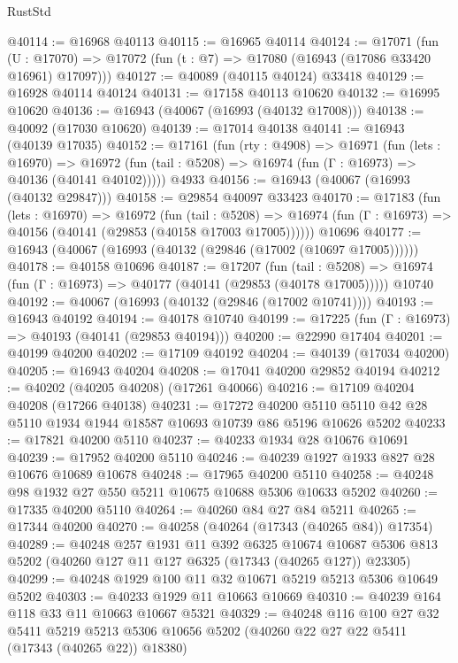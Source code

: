 \begin{lexlean}{RustStd}
\begin{coremodule}
@40114 := @16968 @40113
@40115 := @16965 @40114
@40124 := @17071
    (fun (U : @17070) => @17072 (fun (t : @7) => @17080 (@16943 (@17086 @33420 @16961) @17097)))
@40127 := @40089 (@40115 @40124) @33418
@40129 := @16928 @40114 @40124
@40131 := @17158 @40113 @10620
@40132 := @16995 @10620
@40136 := @16943 (@40067 (@16993 (@40132 @17008)))
@40138 := @40092 (@17030 @10620)
@40139 := @17014 @40138
@40141 := @16943 (@40139 @17035)
@40152 := @17161
    (fun (rty : @4908) =>
    @16971
      (fun (lets : @16970) =>
      @16972 (fun (tail : @5208) => @16974 (fun (Γ : @16973) => @40136 (@40141 @40102)))))
    @4933
@40156 := @16943 (@40067 (@16993 (@40132 @29847)))
@40158 := @29854 @40097 @33423
@40170 := @17183
    (fun (lets : @16970) =>
    @16972
      (fun (tail : @5208) =>
      @16974 (fun (Γ : @16973) => @40156 (@40141 (@29853 (@40158 @17003 @17005))))))
    @10696
@40177 := @16943 (@40067 (@16993 (@40132 (@29846 (@17002 (@10697 @17005))))))
@40178 := @40158 @10696
@40187 := @17207
    (fun (tail : @5208) => @16974 (fun (Γ : @16973) => @40177 (@40141 (@29853 (@40178 @17005)))))
    @10740
@40192 := @40067 (@16993 (@40132 (@29846 (@17002 @10741))))
@40193 := @16943 @40192
@40194 := @40178 @10740
@40199 := @17225 (fun (Γ : @16973) => @40193 (@40141 (@29853 @40194)))
@40200 := @22990 @17404
@40201 := @40199 @40200
@40202 := @17109 @40192
@40204 := @40139 (@17034 @40200)
@40205 := @16943 @40204
@40208 := @17041 @40200 @29852 @40194
@40212 := @40202 (@40205 @40208) (@17261 @40066)
@40216 := @17109 @40204 @40208 (@17266 @40138)
@40231 := @17272
    @40200
    @5110
    @5110
    @42
    @28
    @5110
    @1934
    @1944
    @18587
    @10693
    @10739
    @86
    @5196
    @10626
    @5202
@40233 := @17821 @40200 @5110
@40237 := @40233 @1934 @28 @10676 @10691
@40239 := @17952 @40200 @5110
@40246 := @40239 @1927 @1933 @827 @28 @10676 @10689 @10678
@40248 := @17965 @40200 @5110
@40258 := @40248 @98 @1932 @27 @550 @5211 @10675 @10688 @5306 @10633 @5202
@40260 := @17335 @40200 @5110
@40264 := @40260 @84 @27 @84 @5211
@40265 := @17344 @40200
@40270 := @40258 (@40264 (@17343 (@40265 @84)) @17354)
@40289 := @40248
    @257
    @1931
    @11
    @392
    @6325
    @10674
    @10687
    @5306
    @813
    @5202
    (@40260 @127 @11 @127 @6325 (@17343 (@40265 @127)) @23305)
@40299 := @40248 @1929 @100 @11 @32 @10671 @5219 @5213 @5306 @10649 @5202
@40303 := @40233 @1929 @11 @10663 @10669
@40310 := @40239 @164 @118 @33 @11 @10663 @10667 @5321
@40329 := @40248
    @116
    @100
    @27
    @32
    @5411
    @5219
    @5213
    @5306
    @10656
    @5202
    (@40260 @22 @27 @22 @5411 (@17343 (@40265 @22)) @18380)

\end{coremodule}
\end{lexlean}
